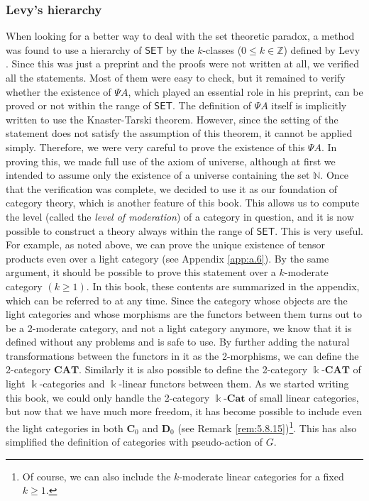 \documentclass{surv-l}
\numberwithin{equation}{chapter}
\numberwithin{figure}{chapter}
\theoremstyle{plain}
\theoremstyle{definition}
\theoremstyle{remark}
\newcommand{\kCAT}{\Bbbk\text{-}\mathbf{CAT}}
\newcommand{\kCat}{\Bbbk\text{-}\mathbf{Cat}}
\begin{document}
\subsubsection*{Levy's hierarchy}

When looking for a better way to deal with the set theoretic paradox, a method was found to use a hierarchy of $\mathsf{SET}$ by
the $k$-classes ($0 \le k \in \mathbb{Z}$) defined by Levy \cite{Le18}.
Since this was just a preprint and the proofs were not written at all,
we verified all the statements.
Most of them were easy to check, but it remained to verify
whether the existence of $\Psi A$, which played an essential role in his preprint, can be proved or not
within the range of $\mathsf{SET}$.
The definition of $\Psi A$ itself is implicitly written to use the Knaster-Tarski theorem.
However, since the setting of the statement does not satisfy the assumption of this theorem,
it cannot be applied simply.
Therefore, we were very careful to prove the existence of this $\Psi A$.
In proving this, we made full use of the axiom of universe,
although at first we intended to assume only the existence of a universe
containing the set $\mathbb{N}$.
Once that the verification was complete,
we decided to use it as our foundation of category theory,
which is another feature of this book.
This allows us to compute the level (called the {\em level of moderation}) of a category in question,
and it is now possible to construct a theory always within the range of $\mathsf{SET}$.
This is very useful.
For example, as noted above,
we can prove the unique existence of tensor products even over a light category
(see Appendix \ref{app:a.6}).
By the same argument, it should be possible to prove this statement
over a $k$-moderate category $(k \ge 1)$.
In this book, these contents are summarized in the appendix,
which can be referred to at any time.
Since the category whose objects are the light categories and whose morphisms
are the functors between them turns out to be a 2-moderate category,
and not a light category anymore,
we know that it is defined without any problems and is safe to use.
By further adding the natural transformations
between the functors in it as the 2-morphisms,
we can define the 2-category $\mathbf{CAT}$.
Similarly it is also possible to define the 2-category $\kCAT$
of light $\Bbbk$-categories and $\Bbbk$-linear functors between them.
As we started writing this book, we could only handle the 2-category $\kCat$
of small linear categories, but now that we have much more freedom,
it has become possible to include even the light categories in both $\mathbf{C}_0$ and $\mathbf{D}_0$
(see Remark \ref{rem:5.8.15})\footnote{Of course, we can also include the $k$-moderate linear categories for a fixed $k \ge 1$.}.
This has also simplified the definition of categories with pseudo-action of $G$.
\end{document}
